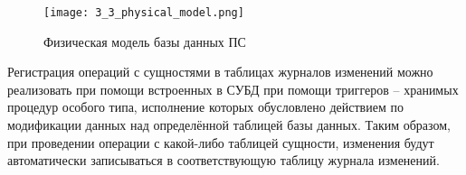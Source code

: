 \begin{figure}[H]
    \centering
    \texttt{[image: 3\_3\_physical\_model.png]}
    \caption{Физическая модель базы данных ПС}
    \setlength\intextsep{2pt}
    \label{fig:design:database:model:diagram}
\end{figure}

Регистрация операций с сущностями в таблицах журналов изменений можно реализовать при помощи встроенных в СУБД \sqlite при помощи триггеров -- хранимых процедур особого типа, исполнение которых обусловлено действием по модификации данных над определённой таблицей базы данных.
Таким образом, при проведении операции с какой-либо таблицей сущности, изменения будут автоматически записываться в соответствующую таблицу журнала изменений.

%
%
%
%
